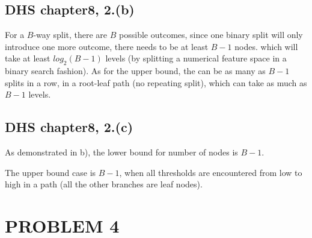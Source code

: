 \documentclass{article}
\begin{document}
	\subsection{DHS chapter8, 2.(b)}
		For a $B$-way split, there are $B$ possible outcomes, since one binary split will only introduce one more outcome, there needs to be at least $B-1$ nodes. which will take at least $log_2(B-1)$ levels (by splitting a numerical feature space in a binary search fashion).
		As for the upper bound, the can be as many as $B-1$ splits in a row, in a root-leaf path (no repeating split), which can take as much as $B-1$ levels.

	\subsection{DHS chapter8, 2.(c)}
		As demonstrated in b), the lower bound for number of nodes is $B-1$.\par
		The upper bound case is $B-1$, when all thresholds are encountered from low to high in a path (all the other branches are leaf nodes).

 

	\section{PROBLEM 4}
\end{document}
